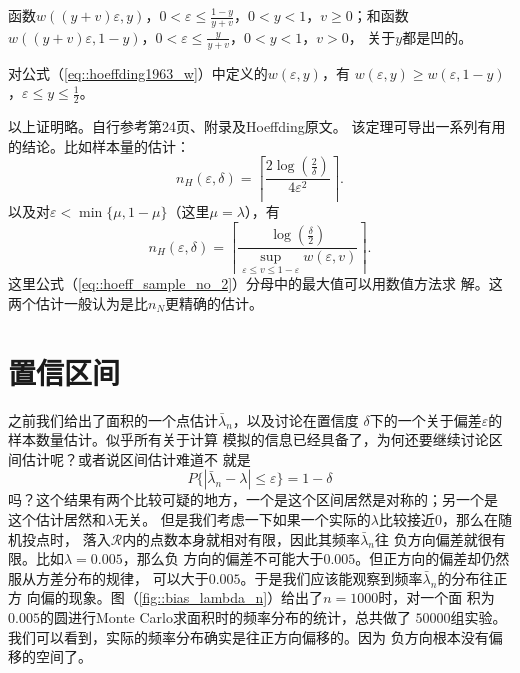 \begin{corollary}
  函数$w((y + v)\varepsilon, y)$，$0 < \varepsilon \leq \frac{1 - y}{y
    + v}$，$0 < y < 1$，$v \geq 0$；和函数$w((y + v)\varepsilon, 1 -
  y)$，$0 < \varepsilon \leq \frac{y}{y + v}$，$0 < y < 1$，$v > 0$，
  关于$y$都是凹的。
  \label{cor::hoeff_3}
\end{corollary}

\begin{corollary}
  对公式（\ref{eq::hoeffding1963_w}）中定义的$w(\varepsilon, y)$，有
  $w(\varepsilon, y) \geq w(\varepsilon, 1 - y)$，$\varepsilon \leq y
  \leq \frac{1}{2}$。
  \label{cor::hoeff_4}
\end{corollary}

以上证明略。自行参考\cite{Fishman1995Monte}第24页、附录及Hoeffding原文。
该定理可导出一系列有用的结论。比如样本量的估计：
\begin{equation}
  n_H(\varepsilon, \delta) =
  \left\lceil\frac{2\log(\frac{2}{\delta})}{4\varepsilon^2}\right\rceil.
  \label{eq::hoeff_sample_no_1}
\end{equation}
以及对$\varepsilon < \min\{\mu, 1 - \mu\}$（这里$\mu = \lambda$），有
\begin{equation}
  n_H(\varepsilon, \delta) =
  \left\lceil\frac{\log(\frac{\delta}{2})}
                   {\sup_{\varepsilon \leq v \leq 1 - \varepsilon} w(\varepsilon, v)}
                   \right\rceil.
  \label{eq::hoeff_sample_no_2}
\end{equation}
这里公式（\ref{eq::hoeff_sample_no_2}）分母中的最大值可以用数值方法求
解。这两个估计一般认为是比$n_N$更精确的估计。

\section{置信区间}

之前我们给出了面积的一个点估计$\bar{\lambda}_n$，以及讨论在置信度
$\delta$下的一个关于偏差$\varepsilon$的样本数量估计。似乎所有关于计算
模拟的信息已经具备了，为何还要继续讨论区间估计呢？或者说区间估计难道不
就是
$$
P\{|\bar{\lambda}_n - \lambda| \leq \varepsilon\} = 1 - \delta
$$
吗？这个结果有两个比较可疑的地方，一个是这个区间居然是对称的；另一个是
这个估计居然和$\lambda$无关。
但是我们考虑一下如果一个实际的$\lambda$比较接近$0$，那么在随机投点时，
落入$\mathscr{R}$内的点数本身就相对有限，因此其频率$\bar{\lambda}_n$往
负方向偏差就很有限。比如$\lambda = 0.005$，那么负
方向的偏差不可能大于$0.005$。但正方向的偏差却仍然服从方差分布的规律，
可以大于$0.005$。于是我们应该能观察到频率$\bar{\lambda}_n$的分布往正方
向偏的现象。图（\ref{fig::bias_lambda_n}）给出了$n = 1000$时，对一个面
积为$0.005$的圆进行Monte Carlo求面积时的频率分布的统计，总共做了
$50000$组实验。我们可以看到，实际的频率分布确实是往正方向偏移的。因为
负方向根本没有偏移的空间了。

